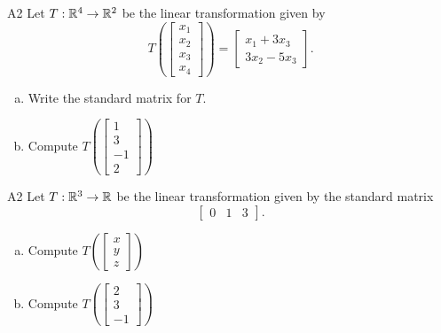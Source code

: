 \begin{problem}{A2}
Let $T: \mathbb{R}^4 \rightarrow \mathbb{R}^2$ be the linear transformation given by $$T\left(\begin{bmatrix} x_1 \\ x_2 \\ x_3 \\ x_4 \end{bmatrix} \right) = \begin{bmatrix} x_1+3x_3 \\ 3x_2-5x_3 \end{bmatrix}.$$
\begin{enumerate}[(a)]
\item Write the standard matrix for $T$.
\item Compute \( T\left( \begin{bmatrix} 1 \\ 3  \\ -1 \\ 2\end{bmatrix} \right) \)
\end{enumerate}
\end{problem}




\begin{problem}{A2}
Let $T: \mathbb{R}^3 \rightarrow \mathbb{R}$ be the linear transformation given by the standard matrix
$$\begin{bmatrix} 0 & 1 & 3 \end{bmatrix}.$$
\begin{enumerate}[(a)]
\item Compute \( T\left( \begin{bmatrix}x\\ y \\ z  \end{bmatrix} \right) \)
\item Compute \( T\left( \begin{bmatrix} 2 \\ 3 \\ -1\end{bmatrix} \right) \)
\end{enumerate}
\end{problem}


